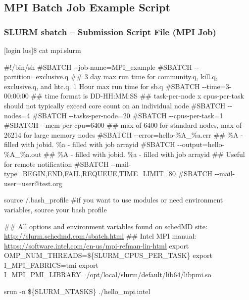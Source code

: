 \documentclass[t,hyperref={pdfpagelabels=false}]{beamer}
\newcommand{\ctilde}{{\fontfamily{ptm}\selectfont\texttildelow}}
\newcommand{\ddash}{-{}-}
\begin{document}
\subsection{MPI Batch Job Example Script}
\begin{frame}[fragile]
\frametitle{SLURM sbatch -- Submission Script File (MPI Job)}
\begin{semiverbatim}\tiny
[login lus]\$ cat mpi.slurm

\#!/bin/sh
\#SBATCH \ddash{}job-name=MPI\_example
\#SBATCH \ddash{}partition=exclusive.q
\#\# 3 day max run time for community.q, kill.q, exclusive.q, and htc.q.  1 Hour max run time for sb.q
\#SBATCH \ddash{}time=3-00:00:00 ## time format is DD-HH:MM:SS
\#\# task-per-node x cpus-per-task should not typically exceed core count on an individual node 
\#SBATCH \ddash{}nodes=4
\#SBATCH \ddash{}tasks-per-node=20
\#SBATCH \ddash{}cpus-per-task=1
\#SBATCH \ddash{}mem-per-cpu=6400 \#\# max of 6400 for standard nodes, max of 26214 for large memory nodes                                                                                                                                             
\#SBATCH \ddash{}error=hello-\%A\_\%a.err \#\# \%A - filled with jobid. \%a - filled with job arrayid
\#SBATCH \ddash{}output=hello-\%A\_\%a.out \#\# \%A - filled with jobid. \%a - filled with job arrayid
\#\# Useful for remote notification
\#SBATCH \ddash{}mail-type=BEGIN,END,FAIL,REQUEUE,TIME\_LIMIT\_80
\#SBATCH \ddash{}mail-user=user@test.org

source \ctilde/.bash_profile \#if you want to use modules or need environment variables, source your bash profile

\#\# All options and environment variables found on schedMD site: \href{http://slurm.schedmd.com/sbatch.html}{http://slurm.schedmd.com/sbatch.html}
\#\# Intel MPI manual: \href{https://software.intel.com/en-us/mpi-refman-lin-html}{https://software.intel.com/en-us/mpi-refman-lin-html}
export OMP\_NUM\_THREADS=\$\{SLURM\_CPUS\_PER\_TASK\}
export I\_MPI\_FABRICS=tmi  
export I\_MPI\_PMI\_LIBRARY=/opt/local/slurm/default/lib64/libpmi.so

srun  -n \$\{SLURM\_NTASKS\}  ./hello\_mpi.intel 
\end{semiverbatim}
\end{frame}
\end{document}
